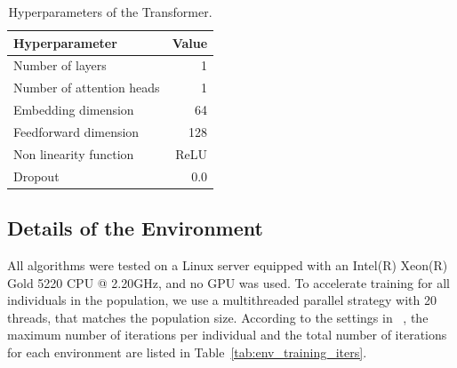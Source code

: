 \documentclass{article}
\begin{document}
    \begin{table}[H]
        \centering
        \caption{Hyperparameters of the Transformer.}
        \label{tab:transformer_hyperparams}
        \begin{tabular}{lr}
            \toprule \textbf{Hyperparameter} & \textbf{Value} \\
            \midrule Number of layers        & 1              \\
            Number of attention heads        & 1              \\
            Embedding dimension              & 64             \\
            Feedforward dimension            & 128            \\
            Non linearity function           & ReLU           \\
            Dropout                          & 0.0            \\
            \bottomrule
        \end{tabular}
    \end{table}
    \clearpage
    \subsection{Details of the Environment}
    All algorithms were tested on a Linux server equipped with an Intel(R) Xeon(R)
    Gold 5220 CPU @ 2.20GHz, and no GPU was used. To accelerate training for all
    individuals in the population, we use a multithreaded parallel strategy with
    20 threads, that matches the population size. According to the settings in ~\cite{bhatia2021evolution},
    the maximum number of iterations per individual and the total number of iterations
    for each environment are listed in Table~\ref{tab:env_training_iters}.
\end{document}
